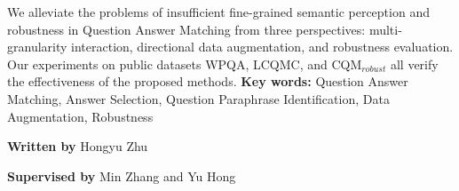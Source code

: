 \begin{eabstract}
	We alleviate the problems of insufficient fine-grained semantic perception and robustness in Question Answer Matching from three perspectives: multi-granularity interaction, directional data augmentation, and robustness evaluation. 
	Our experiments on public datasets WPQA, LCQMC, and CQM$_{robust}$ all verify the effectiveness of the proposed methods.
	\vskip 10bp
	\noindent
	{\bf{} Key words: }
	Question Answer Matching,
	Answer Selection,
	Question Paraphrase Identification,
	Data Augmentation,
	Robustness

	\begin{flushright}
		{\bf{} Written by} Hongyu Zhu
		
		{\bf{} Supervised by} Min Zhang and Yu Hong
	\end{flushright}
		
\end{eabstract}
